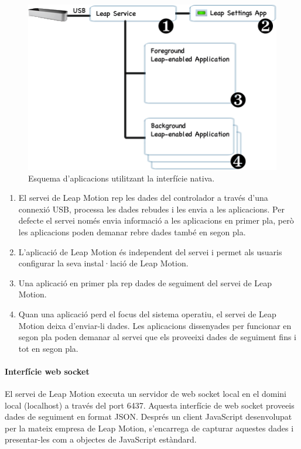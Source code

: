 \documentclass[12pt,a4paper,catalan]{article}
\begin{document}
	\begin{figure}[H]
		\includegraphics[width=\textwidth,keepaspectratio]{native-interface.png}
		\centering
		\caption{Esquema d'aplicacions utilitzant la interfície nativa.}
	\end{figure}
	\begin{enumerate}
		\item El servei de Leap Motion rep les dades del controlador a través d'una connexió USB, processa les dades rebudes i les envia a les aplicacions. Per defecte el servei només envia informació a les aplicacions en primer pla, però les aplicacions poden demanar rebre dades també en segon pla.
		\item L'aplicació de Leap Motion és independent del servei i permet als usuaris configurar la seva instal·lació de Leap Motion.
		\item Una aplicació en primer pla rep dades de seguiment del servei de Leap Motion.
		\item Quan una aplicació perd el focus del sistema operatiu, el servei de Leap Motion deixa d'enviar-li dades. Les aplicacions dissenyades per funcionar en segon pla poden demanar al servei que els proveeixi dades de seguiment fins i tot en segon pla.
	\end{enumerate}
	
	\paragraph{Interfície web socket}
	El servei de Leap Motion executa un servidor de web socket local en el domini local (localhost) a través del port 6437. Aquesta interfície de web socket proveeis dades de seguiment en format JSON. Després un client JavaScript desenvolupat per la mateix empresa de Leap Motion, s'encarrega de capturar aquestes dades i presentar-les com a objectes de JavaScript estàndard.
	
\end{document}
